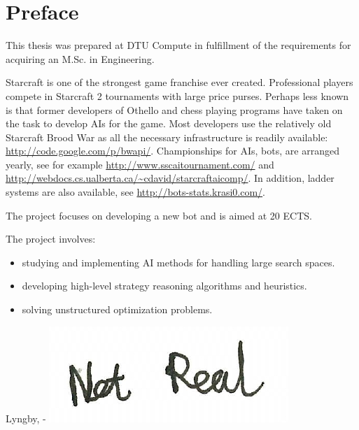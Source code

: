 \chapter{Preface}
This thesis was prepared at DTU Compute in fulfillment of the requirements for acquiring an M.Sc. in Engineering.

Starcraft is one of the strongest game franchise ever created. Professional players compete in Starcraft 2 tournaments with large price purses. Perhaps less known is that former developers of Othello and chess playing programs have taken on the task to develop AIs for the game. Most developers use the relatively old Starcraft Brood War as all the necessary infrastructure is readily available: \url{http://code.google.com/p/bwapi/}. Championships for AIs, bots, are arranged yearly, see for example \url{http://www.sscaitournament.com/} and \url{http://webdocs.cs.ualberta.ca/~cdavid/starcraftaicomp/}. In addition, ladder systems are also available, see \url{http://bots-stats.krasi0.com/}.

The project focuses on developing a new bot and is aimed at 20 ECTS.

The project involves:
\begin{itemize}
	\item studying and implementing AI methods for handling large search spaces.
	\item developing high-level strategy reasoning algorithms and heuristics.
	\item solving unstructured optimization problems.
\end{itemize}

\vspace{20mm}
\begin{center}
    \hspace{20mm} Lyngby, \thesishandin-\thesisyear
    \vspace{5mm}
    \newline
    \includegraphics[scale=0.5]{figures/SignatureDummy}
\end{center}
\begin{flushright}
    \thesisauthor
\end{flushright}
